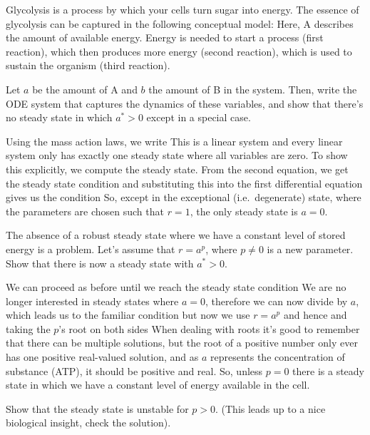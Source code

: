 Glycolysis is a process by which your cells turn sugar into energy. The essence of glycolysis can be captured in the following conceptual model: 
Here, A describes the amount of available energy. Energy is needed to start a process (first reaction), which then produces more energy (second reaction), which is used to sustain the organism (third reaction).

\subquestion 
Let $a$ be the amount of A and $b$ the amount of B in the system. Then, write the ODE system that captures the dynamics of these variables, and show that there's no steady state in which $a^*>0$ except in a special case. 

\solution
Using the mass action laws, we write 
This is a linear system and every linear system only has exactly one steady state where all variables are zero. To show this explicitly, we compute the steady state. From the second equation, we get the steady state condition
and substituting this into the first differential equation gives us the condition
So, except in the exceptional (i.e.~degenerate) state, where the parameters are chosen such that $r=1$, the only steady state is $a=0$.

\subquestion 
The absence of a robust steady state where we have a constant level of stored energy is a problem. Let's assume that $r=a^p$, where $p\neq0$ is a new parameter. Show that there is now a steady state with $a^*>0$.

\solution 
We can proceed as before until we reach the steady state condition
We are no longer interested in steady states where $a=0$, therefore we can now divide by $a$, which leads us to the familiar condition 
but now we use $r=a^p$ and hence 
and taking the $p$'s root on both sides
When dealing with roots it's good to remember that there can be multiple solutions, but the root of a positive number only ever has one positive real-valued solution, and as $a$ represents the concentration of substance (ATP), it should be positive and real. So, unless $p=0$ there is a steady state in which we have a constant level of energy available in the cell.  

\subquestion 
Show that the steady state is unstable for $p>0$. (This leads up to a nice biological insight, check the solution).

